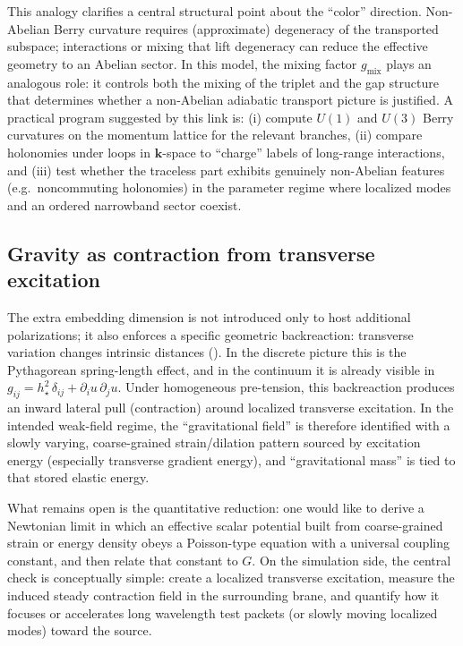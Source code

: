 This analogy clarifies a central structural point about the ``color'' direction.
Non-Abelian Berry curvature requires (approximate) degeneracy of the transported subspace; interactions or mixing that
lift degeneracy can reduce the effective geometry to an Abelian sector.
In this model, the mixing factor $g_{\mathrm{mix}}$ plays an analogous role: it controls both the mixing of the triplet and
the gap structure that determines whether a non-Abelian adiabatic transport picture is justified.
A practical program suggested by this link is:
(i) compute $U(1)$ and $U(3)$ Berry curvatures on the momentum lattice for the relevant branches,
(ii) compare holonomies under loops in $\mathbf{k}$-space to ``charge'' labels of long-range interactions, and
(iii) test whether the traceless part exhibits genuinely non-Abelian features (e.g.\ noncommuting holonomies) in the
parameter regime where localized modes and an ordered narrowband sector coexist.

\subsection{Gravity as contraction from transverse excitation}

The extra embedding dimension is not introduced only to host additional polarizations; it also enforces a specific
geometric backreaction: transverse variation changes intrinsic distances ().
In the discrete picture this is the Pythagorean spring-length effect, and in the continuum it is already visible in
$g_{ij}=h_\star^2\,\delta_{ij}+\partial_i u\,\partial_j u$.
Under homogeneous pre-tension, this backreaction produces an inward lateral pull (contraction) around localized
transverse excitation.
In the intended weak-field regime, the ``gravitational field'' is therefore identified with a slowly varying,
coarse-grained strain/dilation pattern sourced by excitation energy (especially transverse gradient energy), and
``gravitational mass'' is tied to that stored elastic energy.

What remains open is the quantitative reduction: one would like to derive a Newtonian limit in which an effective
scalar potential built from coarse-grained strain or energy density obeys a Poisson-type equation with a universal
coupling constant, and then relate that constant to $G$.
On the simulation side, the central check is conceptually simple: create a localized transverse excitation, measure
the induced steady contraction field in the surrounding brane, and quantify how it focuses or accelerates long
wavelength test packets (or slowly moving localized modes) toward the source.

